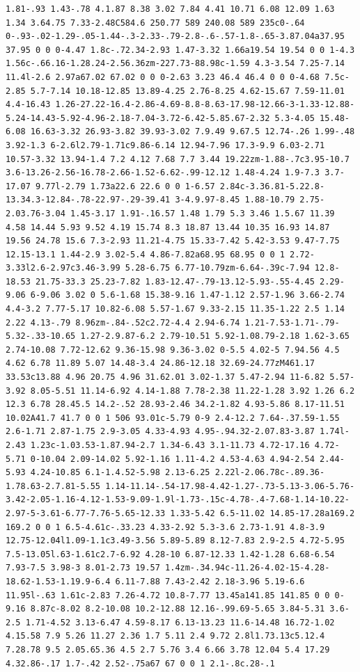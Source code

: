 \documentclass[11pt]{article}
\begin{document}
\begin{enumerate}
\begin{verbatim}
1.81-.93 1.43-.78 4.1.87 8.38 3.02 7.84 4.41 10.71 6.08 12.09 1.63 1.34 3.64.75 7.33-2.48C584.6 250.77 589 240.08 589 235c0-.64 0-.93-.02-1.29-.05-1.44-.3-2.33-.79-2.8-.6-.57-1.8-.65-3.87.04a37.95 37.95 0 0 0-4.47 1.8c-.72.34-2.93 1.47-3.32 1.66a19.54 19.54 0 0 1-4.3 1.56c-.66.16-1.28.24-2.56.36zm-227.73-88.98c-1.59 4.3-3.54 7.25-7.14 11.4l-2.6 2.97a67.02 67.02 0 0 0-2.63 3.23 46.4 46.4 0 0 0-4.68 7.5c-2.85 5.7-7.14 10.18-12.85 13.89-4.25 2.76-8.25 4.62-15.67 7.59-11.01 4.4-16.43 1.26-27.22-16.4-2.86-4.69-8.8-8.63-17.98-12.66-3-1.33-12.88-5.24-14.43-5.92-4.96-2.18-7.04-3.72-6.42-5.85.67-2.32 5.3-4.05 15.48-6.08 16.63-3.32 26.93-3.82 39.93-3.02 7.9.49 9.67.5 12.74-.26 1.99-.48 3.92-1.3 6-2.6l2.79-1.71c9.86-6.14 12.94-7.96 17.3-9.9 6.03-2.71 10.57-3.32 13.94-1.4 7.2 4.12 7.68 7.7 3.44 19.22zm-1.88-.7c3.95-10.7 3.6-13.26-2.56-16.78-2.66-1.52-6.62-.99-12.12 1.48-4.24 1.9-7.3 3.7-17.07 9.77l-2.79 1.73a22.6 22.6 0 0 1-6.57 2.84c-3.36.81-5.22.8-13.34.3-12.84-.78-22.97-.29-39.41 3-4.9.97-8.45 1.88-10.79 2.75-2.03.76-3.04 1.45-3.17 1.91-.16.57 1.48 1.79 5.3 3.46 1.5.67 11.39 4.58 14.44 5.93 9.52 4.19 15.74 8.3 18.87 13.44 10.35 16.93 14.87 19.56 24.78 15.6 7.3-2.93 11.21-4.75 15.33-7.42 5.42-3.53 9.47-7.75 12.15-13.1 1.44-2.9 3.02-5.4 4.86-7.82a68.95 68.95 0 0 1 2.72-3.33l2.6-2.97c3.46-3.99 5.28-6.75 6.77-10.79zm-6.64-.39c-7.94 12.8-18.53 21.75-33.3 25.23-7.82 1.83-12.47-.79-13.12-5.93-.55-4.45 2.29-9.06 6-9.06 3.02 0 5.6-1.68 15.38-9.16 1.47-1.12 2.57-1.96 3.66-2.74 4.4-3.2 7.77-5.17 10.82-6.08 5.57-1.67 9.33-2.15 11.35-1.22 2.5 1.14 2.22 4.13-.79 8.96zm-.84-.52c2.72-4.4 2.94-6.74 1.21-7.53-1.71-.79-5.32-.33-10.65 1.27-2.9.87-6.2 2.79-10.51 5.92-1.08.79-2.18 1.62-3.65 2.74-10.08 7.72-12.62 9.36-15.98 9.36-3.02 0-5.5 4.02-5 7.94.56 4.5 4.62 6.78 11.89 5.07 14.48-3.4 24.86-12.18 32.69-24.77zM461.17 33.53c13.88 4.96 20.75 4.96 31.62.01 3.02-1.37 5.47-2.94 11-6.82 5.57-3.92 8.05-5.51 11.14-6.92 4.14-1.88 7.78-2.38 11.22-1.28 3.92 1.26 6.2 12.3 6.78 28.45.5 14.2-.52 28.93-2.46 34.2-1.82 4.93-5.86 8.17-11.51 10.02A41.7 41.7 0 0 1 506 93.01c-5.79 0-9 2.4-12.2 7.64-.37.59-1.55 2.6-1.71 2.87-1.75 2.9-3.05 4.33-4.93 4.95-.94.32-2.07.83-3.87 1.74l-2.43 1.23c-1.03.53-1.87.94-2.7 1.34-6.43 3.1-11.73 4.72-17.16 4.72-5.71 0-10.04 2.09-14.02 5.92-1.16 1.11-4.2 4.53-4.63 4.94-2.54 2.44-5.93 4.24-10.85 6.1-1.4.52-5.98 2.13-6.25 2.22l-2.06.78c-.89.36-1.78.63-2.7.81-5.55 1.14-11.14-.54-17.98-4.42-1.27-.73-5.13-3.06-5.76-3.42-2.05-1.16-4.12-1.53-9.09-1.9l-1.73-.15c-4.78-.4-7.68-1.14-10.22-2.97-5-3.61-6.77-7.76-5.65-12.33 1.33-5.42 6.5-11.02 14.85-17.28a169.2 169.2 0 0 1 6.5-4.61c-.33.23 4.33-2.92 5.3-3.6 2.73-1.91 4.8-3.9 12.75-12.04l1.09-1.1c3.49-3.56 5.89-5.89 8.12-7.83 2.9-2.5 4.72-5.95 7.5-13.05l.63-1.61c2.7-6.92 4.28-10 6.87-12.33 1.42-1.28 6.68-6.54 7.93-7.5 3.98-3 8.01-2.73 19.57 1.4zm-.34.94c-11.26-4.02-15-4.28-18.62-1.53-1.19.9-6.4 6.11-7.88 7.43-2.42 2.18-3.96 5.19-6.6 11.95l-.63 1.61c-2.83 7.26-4.72 10.8-7.77 13.45a141.85 141.85 0 0 0-9.16 8.87c-8.02 8.2-10.08 10.2-12.88 12.16-.99.69-5.65 3.84-5.31 3.6-2.5 1.71-4.52 3.13-6.47 4.59-8.17 6.13-13.23 11.6-14.48 16.72-1.02 4.15.58 7.9 5.26 11.27 2.36 1.7 5.11 2.4 9.72 2.8l1.73.13c5.12.4 7.28.78 9.5 2.05.65.36 4.5 2.7 5.76 3.4 6.66 3.78 12.04 5.4 17.29 4.32.86-.17 1.7-.42 2.52-.75a67 67 0 0 1 2.1-.8c.28-.1 
\end{verbatim}
\end{enumerate}
\end{document}
